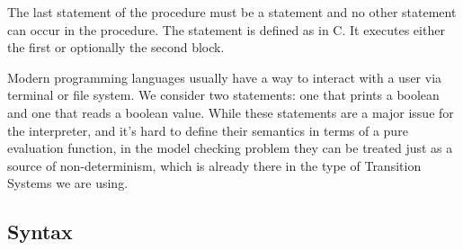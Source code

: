 \documentclass{article}
\begin{document}
The last statement of the procedure must be a  statement and no other  statement can occur in the procedure. 
The  statement is defined as in C. It executes either the first or optionally the second block.

Modern programming languages usually have a way to interact with a user via terminal or file system. 
We consider two statements: one that prints a boolean and one that reads a boolean value.
While these statements are a major issue for the interpreter, 
and it's hard to define their semantics in terms of a pure evaluation function, 
in the model checking problem they can be treated just as a source of non-determinism, 
which is already there in the type of Transition Systems we are using.

\subsection{Syntax}
\end{document}
